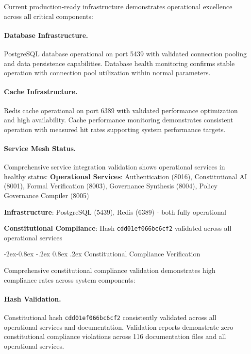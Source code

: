 \documentclass[manuscript,screen,9pt]{acmart}
\makeatletter
\renewcommand\subsubsection{\@startsection{subsubsection}{3}{\z@}%
  {-2ex\@plus -0.8ex \@minus -.2ex}%
  {0.8ex \@plus .2ex}%
  {\normalfont\normalsize\bfseries}}
\makeatother
\begin{document}
Current production-ready infrastructure demonstrates operational excellence across all critical components:

\paragraph{Database Infrastructure.} PostgreSQL database operational on port 5439 with validated connection pooling and data persistence capabilities. Database health monitoring confirms stable operation with connection pool utilization within normal parameters.

\paragraph{Cache Infrastructure.} Redis cache operational on port 6389 with validated performance optimization and high availability. Cache performance monitoring demonstrates consistent operation with measured hit rates supporting system performance targets.

\paragraph{Service Mesh Status.} Comprehensive service integration validation shows operational services in healthy status:
\noindent\textbf{Operational Services}: Authentication (8016), Constitutional AI (8001), Formal Verification (8003), Governance Synthesis (8004), Policy Governance Compiler (8005)

\noindent\textbf{Infrastructure}: PostgreSQL (5439), Redis (6389) - both fully operational

\noindent\textbf{Constitutional Compliance}: Hash \texttt{\small{cdd01ef066bc6cf2}} validated across all operational services

\subsubsection{Constitutional Compliance Verification}
\label{subsubsec:constitutional_compliance_verification}

Comprehensive constitutional compliance validation demonstrates high compliance rates across system components:

\paragraph{Hash Validation.} Constitutional hash \texttt{cdd01ef066bc6cf2} consistently validated across all operational services and documentation. Validation reports demonstrate zero constitutional compliance violations across 116 documentation files and all operational services.
\end{document}
